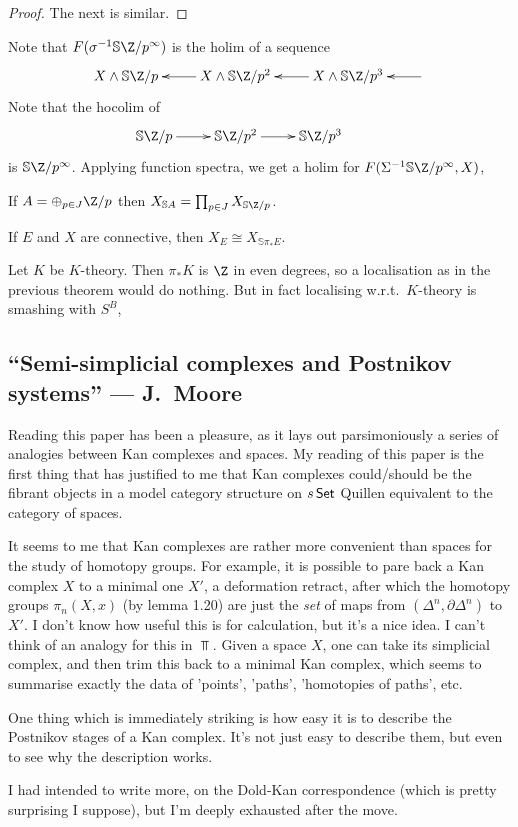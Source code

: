 \documentclass[11pt]{article}
\newcommand{\KanSemResponse}[1]
{
\thispagestyle{fancy}
\subsection*{#1}
}
\begin{document}
\begin{MarkusLocalisation}
\begin{enumerate}
\begin{proof}
The next is similar.
\end{proof}
Note that $F(\sigma^{-1}\mathbb{S}\Z/p^\infty)$ is the holim of a sequence
\[\xymatrix{
X\sprod \mathbb{S}\Z/p&\ar[l]X\sprod \mathbb{S}\Z/p^2&\ar[l]X\sprod \mathbb{S}\Z/p^3&\ar[l]
}\]
Note that the hocolim of 
\[\xymatrix{
 \mathbb{S}\Z/p&\ar[l];[] \mathbb{S}\Z/p^2&\ar[l];[] \mathbb{S}\Z/p^3&
}\]
is $\mathbb{S}\Z/p^\infty$.
Applying function spectra, we get a holim for $F(\Sigma^{-1}\mathbb{S}\Z/p^\infty,X)$,
\end{enumerate}
\begin{thm*}
If $A=\oplus_{p\in J}\Z/p$ then $X_{\mathbb{S}A}=\prod_{p\in J}X_{\mathbb{S}\Z/p}$.
\end{thm*}
\begin{thm*}
If $E$ and $X$ are connective, then $X_E\cong X_{\mathbb{S}\pi_*E}$.
\end{thm*}
\begin{defn*}
Let $K$ be $K$-theory. Then $\pi_*K$ is $\Z$ in even degrees, so a localisation as in the previous theorem would do nothing. But in fact localising w.r.t.\ $K$-theory is smashing with $S^B$, 
\end{defn*}


\pagebreak
\end{MarkusLocalisation}
\begin{MoorePostnikovSystems}
\KanSemResponse
{``Semi-simplicial complexes and Postnikov systems'' --- J.\ Moore}
Reading this paper has been a pleasure, as it lays out parsimoniously a series of analogies between Kan complexes and spaces. My reading of this paper is the first thing that has justified to me that Kan complexes could/should be the fibrant objects in a model category structure on $s\operatorname{{\mathsf{Set}}}$ Quillen equivalent to the category of spaces.

It seems to me that Kan complexes are rather more convenient than spaces for the study of homotopy groups. For example, it is possible to pare back a Kan complex $X$ to a minimal one $X'$, a deformation retract, after which the homotopy groups $\pi_n(X,x)$ (by lemma 1.20) are just the \emph{set} of maps from $(\Delta^n,\partial\Delta^n)$ to $X'$. I don't know how useful this is for calculation, but it's a nice idea. I can't think of an analogy for this in $\Top$. Given a space $X$, one can take its simplicial complex, and then trim this back to a minimal Kan complex, which seems to summarise exactly the data of 'points', 'paths', 'homotopies of paths', etc.

One thing which is immediately striking is how easy it is to describe the Postnikov stages of a Kan complex. It's not just easy to describe them, but even to see why the description works.

I had intended to write more, on the Dold-Kan correspondence (which is pretty surprising I suppose), but I'm deeply exhausted after the move.
\pagebreak
\end{MoorePostnikovSystems}
\end{document}
